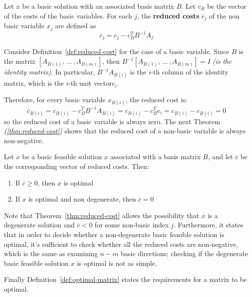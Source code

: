\documentclass[english]{article}
\begin{document}
\begin{definition}
  Let \(x\) be a basic solution with an associated basis matrix \(B\).
  Let \(c_B\) be the vector of the costs of the basic variables.
  For each \(j\), the \textbf{reduced costs} \(\overline{c}_j\) of the non basic variable \(x_j\) are defined as
  \[ \overline{c}_j = c_j - c^T_B B^{-1} A_j \]
  \label{def:reduced-cost}
\end{definition}

\bigskip
Consider Definition~\ref{def:reduced-cost} for the case of a basic variable.
Since \(B\) is the matrix \(\left[ A_{B(1)}, \, \ldots \,, A_{B(m)} \right]\), then \(B^{-1}[A_{B(1)}, \, \ldots \,, A_{B(m)}] = I\) \textit{(is the identity matrix)}.
In particular, \(B^{-1} A_{B(i)}\) is the \(i\)-th column of the identity matrix, which is the \(i\)-th unit vector\(e_i\).

Therefore, for every basic variable \(x_{B(i)}\), the reduced cost is:
\[ \overline{c}_{B(i)} = c_{B(i)} - c^T_B B^{-1} A_{B(i)} = c_{B(i)} - c^T_B e_i = c_{B(i)} -  c_{B(i)} = 0 \]
so the reduced cost of a basic variable is always zero.
The next Theorem \textit{(\ref{thm:reduced-cost})} shows that the reduced cost of a non-basic variable is always non-negative.

\begin{theorem}
  Let \(x\) be a basic feasible solution \(x\) associated with a basis matrix \(B\), and let \(\overline{c}\) be the corresponding vector of reduced costs.
  Then:

  \begin{enumerate}
    \item If \(\overline{c} \geq 0\), then \(x\) is optimal
    \item If \(x\) is optimal and non degenerate, then \(\overline{c} = 0\)
  \end{enumerate}
  \label{thm:reduced-cost}
\end{theorem}

\bigskip
Note that Theorem~\ref{thm:reduced-cost} allows the possibility that \(x\) is a degenerate solution and \(\overline{c} < 0\) for some non-basic index \(j\).
Furthermore, it states that in order to decide whether a non-degenerate basic feasible solution is optimal, it's sufficient to check whether all the reduced costs are non-negative, which is the same as examining \(n-m\) basic directions;
checking if the degenerate basic feasible solution \(x\) is optimal is not as simple.

Finally Definition~\ref{def:optimal-matrix} states the requirements for a matrix to be optimal.
\end{document}
